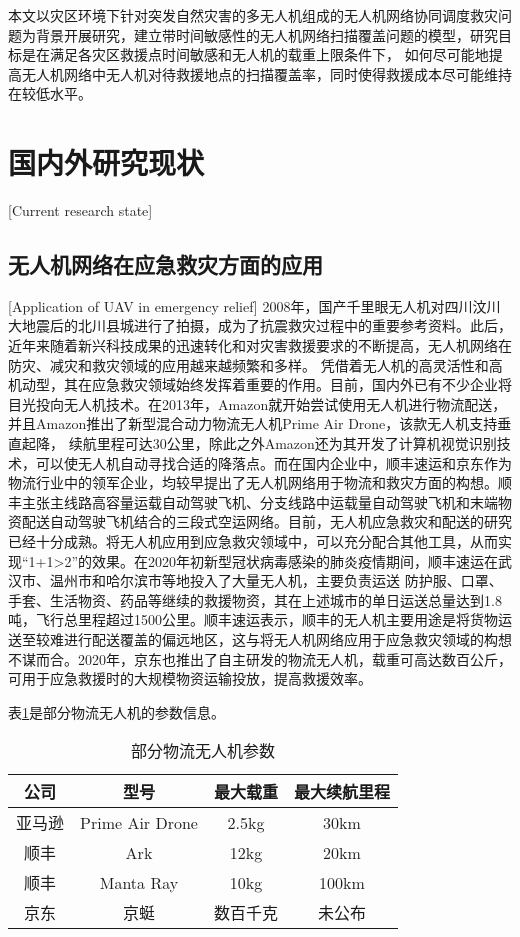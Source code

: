 本文以灾区环境下针对突发自然灾害的多无人机组成的无人机网络协同调度救灾问题为背景开展研究，建立带时间敏感性的无人机网络扫描覆盖问题的模型，研究目标是在满足各灾区救援点时间敏感和无人机的载重上限条件下，
如何尽可能地提高无人机网络中无人机对待救援地点的扫描覆盖率，同时使得救援成本尽可能维持在较低水平。


\section{国内外研究现状}[Current research state]

\subsection{无人机网络在应急救灾方面的应用}[Application of UAV in emergency relief]
2008年，国产千里眼无人机对四川汶川大地震后的北川县城进行了拍摄，成为了抗震救灾过程中的重要参考资料\cite{2010dizhen}。此后，近年来随着新兴科技成果的迅速转化和对灾害救援要求的不断提高，无人机网络在防灾、减灾和救灾领域的应用越来越频繁和多样。
凭借着无人机的高灵活性和高机动型，其在应急救灾领域始终发挥着重要的作用。目前，国内外已有不少企业将目光投向无人机技术。在2013年，Amazon就开始尝试使用无人机进行物流配送，并且Amazon推出了新型混合动力物流无人机Prime Air Drone，该款无人机支持垂直起降，
续航里程可达30公里，除此之外Amazon还为其开发了计算机视觉识别技术，可以使无人机自动寻找合适的降落点\cite{zhanghonghai}。而在国内企业中，顺丰速运和京东作为物流行业中的领军企业，均较早提出了无人机网络用于物流和救灾方面的构想。顺丰主张主线路高容量运载自动驾驶飞机、分支线路中运载量自动驾驶飞机和末端物资配送自动驾驶飞机结合的三段式空运网络。目前，无人机应急救灾和配送的研究已经十分成熟。将无人机应用到应急救灾领域中，可以充分配合其他工具，从而实现“1+1>2”的效果。在2020年初新型冠状病毒感染的肺炎疫情期间，顺丰速运在武汉市、温州市和哈尔滨市等地投入了大量无人机，主要负责运送
防护服、口罩、手套、生活物资、药品等继续的救援物资，其在上述城市的单日运送总量达到1.8吨，飞行总里程超过1500公里。顺丰速运表示，顺丰的无人机主要用途是将货物运送至较难进行配送覆盖的偏远地区，这与将无人机网络应用于应急救灾领域的构想不谋而合。2020年，京东也推出了自主研发的物流无人机，载重可高达数百公斤，可用于应急救援时的大规模物资运输投放，提高救援效率\cite{renxuan}。


表\ref{table1}是部分物流无人机的参数信息。
  \begin{table}[htbp]
    \vspace{0.5em}\centering\wuhao
    \caption{部分物流无人机参数}\label{table1}
    \begin{tabular}{cccc}
    \toprule[1.5pt]
    公司 & 型号 & 最大载重 & 最大续航里程 \\
    \midrule[1.5pt]
    亚马逊 & Prime Air Drone & 2.5kg & 30km \\
    顺丰 & Ark & 12kg & 20km \\
    顺丰 & Manta Ray & 10kg & 100km \\
    京东 & 京蜓 & 数百千克 & 未公布 \\ 
    \bottomrule[1.5pt]
    \end{tabular}
    \end{table}

